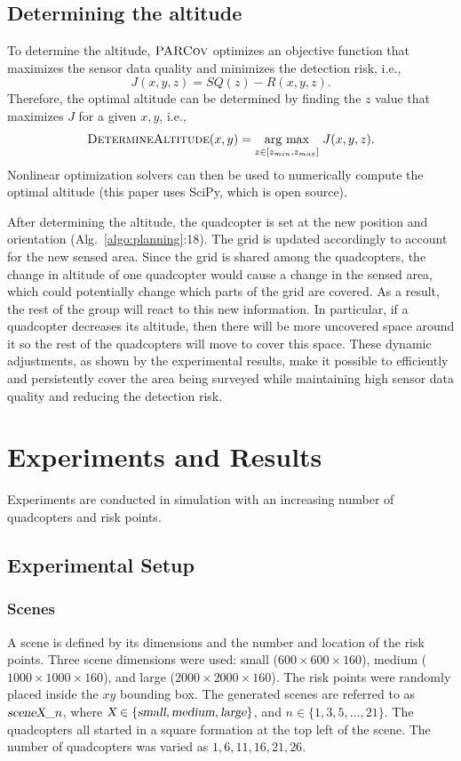 \documentclass[letterpaper, 10pt, conference]{ieeeconf}
\newcommand{\Function}[1]{\ensuremath{{ \textsc{#1}}}}
\newcommand{\Var}[1]{\ensuremath{{{\textsl{#1}}}}}
\newcommand{\Name}{\Function{\small{PARCov}}}
\newcommand{\argmax}[1]{\underset{#1}{\operatorname{arg}\,\operatorname{max}}\;}
\begin{document}
\subsection{Determining the altitude}
\label{sec:Altitude}
To determine the altitude, $\Name$ optimizes an objective function
that maximizes the sensor data quality and
minimizes the detection risk, i.e.,
$$
J(x, y, z) = SQ(z) - R(x, y, z).
$$
Therefore, the optimal altitude can be determined by finding the $z$ value
that maximizes $J$ for a given $x, y$, i.e.,
$$ \Function{DetermineAltitude}(x, y) = \argmax{z \in [z_{min}, z_{max}]} J(x, y,
z).
$$
Nonlinear optimization solvers can then be used to numerically compute
the optimal altitude (this paper uses SciPy, which is open source).

After determining the altitude, the quadcopter is set at the new
position and orientation (Alg.~\ref{algo:planning}:18). The grid is updated accordingly to account
for the new sensed area. Since the grid is
shared among the quadcopters, the change in altitude of one quadcopter
would cause a change in the sensed area,
which could potentially change which parts of the grid are covered. As
a result, the rest of the group will react to this new information. In
particular, if a quadcopter decreases its altitude, then there will be
more uncovered space around it so the rest of the quadcopters will
move to cover this space. These dynamic adjustments, as shown by the
experimental results, make it possible to efficiently and persistently
cover the area being surveyed while maintaining high sensor data quality
and reducing the detection risk.




\section{Experiments and Results}
\label{sec:ExpResults}

Experiments are conducted in simulation with an increasing number of
quadcopters and risk points.

\subsection{Experimental Setup}
\subsubsection{Scenes}
A scene is defined by its dimensions and the number and location of
the risk points. Three scene dimensions were used: small ($600 \times
600 \times 160$), medium ($1000 \times 1000 \times 160$), and large
($2000 \times 2000 \times 160$). The risk points were randomly placed
inside the $xy$ bounding box. The generated scenes are referred to as
$\Var{sceneX}\_n$, where $\Var{X} \in \{\Var{small}, \Var{medium},
\Var{large}\}$, and $n \in \{1, 3, 5, \ldots, 21\}$.  The quadcopters
all started in a square formation at the top left of the scene.  The
number of quadcopters was varied as $1, 6, 11, 16, 21, 26$.
\end{document}
